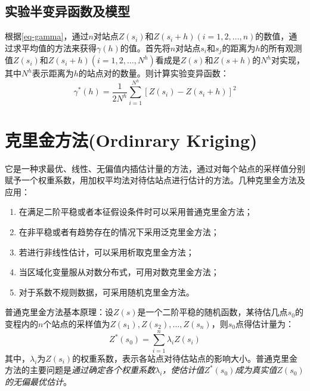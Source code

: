 \subsection{实验半变异函数及模型}

根据\cref{eq-gamma}，通过$n$对站点$Z(s_i)$和$Z(s_i+h)(i=1,2,\dots,n)$的数值，通过求平均值的方法来获得$\gamma(h)$的值。首先将$n$对站点$s_i$和$s_j$的距离为$h$的所有观测值$Z(s_i)$和$Z(s_i+h)(i=1,2,\dots,N^h)$看成是$Z(s)$和$Z(s+h)$的$N^h$对实现，其中$N^h$表示距离为$h$的站点对的数量。则计算实验变异函数：
\begin{equation}
    \gamma^*(h) = \dfrac{1}{2N^h}\sum\limits_{i=1}^{N^h}\left[ Z(s_i)-Z(s_i+h) \right]^2
    \label{eq-realisticgamma}
\end{equation}

\section{克里金方法(Ordinrary Kriging)}
它是一种求最优、线性、无偏值内插估计量的方法，通过对每个站点的采样值分别赋予一个权重系数，用加权平均法对待估站点进行估计的方法。几种克里金方法及应用：
\begin{enumerate}
    \item 在满足二阶平稳或者本征假设条件时可以采用\textcolor[rgb]{1,0,0}{普通克里金方法}；
    \item 在非平稳或者有趋势存在的情况下采用\textcolor[rgb]{1,0,0}{泛克里金方法}；
    \item 若进行非线性估计，可以采用\textcolor[rgb]{1,0,0}{析取克里金方法}；
    \item 当区域化变量服从对数分布式，可用\textcolor[rgb]{1,0,0}{对数克里金方法}；
    \item 对于系数不规则数据，可采用\textcolor[rgb]{1,0,0}{随机克里金方法}。
\end{enumerate}

普通克里金方法基本原理：设$Z(s)$是一个二阶平稳的随机函数，某待估几点$s_0$的变程内的$n$个站点的采样值为$Z(s_1),Z(s_2),\dots,Z(s_n)$，则$s_0$点得估计量为：
\begin{equation}
    Z^*(s_0) = \sum\limits_{i=1}^{n}\lambda_iZ(s_i)
    \label{eq-kriging}
\end{equation}
其中，$\lambda_i$为$Z(s_i)$的权重系数，表示各站点对待估站点的影响大小。普通克里金方法的主要问题是\emph{\textcolor[rgb]{1,0,0}{通过确定各个权重系数$\lambda_i$，使估计值$Z^*(s_0)$成为真实值$Z(s_0)$的无偏最优估计}}。

